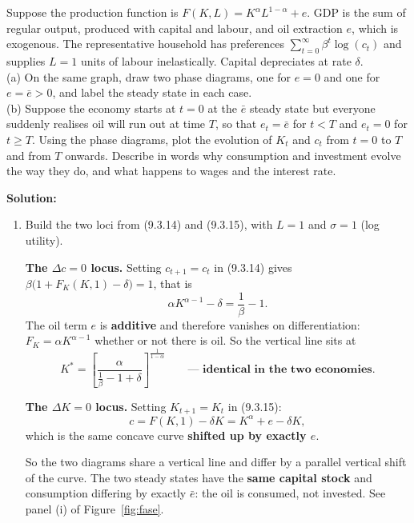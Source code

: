 \documentclass[12pt, letterpaper]{article}
\newcommand{\stst}{^{\ast}}
\begin{document}
\begin{tcolorbox}[oddbox,title={Problem 9.9 \quad An Oil-Producing Economy}]
\begin{tcolorbox}[questionbox]
Suppose the production function is $F(K,L)=K^\alpha L^{1-\alpha}+e$. GDP is the sum of regular
output, produced with capital and labour, and oil extraction $e$, which is exogenous. The
representative household has preferences $\sum_{t=0}^{\infty}\beta^t\log(c_t)$ and supplies
$L=1$ units of labour inelastically. Capital depreciates at rate $\delta$.\\[3pt]
(a) On the same graph, draw two phase diagrams, one for $e=0$ and one for $e=\bar e>0$, and
label the steady state in each case.\\
(b) Suppose the economy starts at $t=0$ at the $\bar e$ steady state but everyone suddenly
realises oil will run out at time $T$, so that $e_t=\bar e$ for $t<T$ and $e_t=0$ for
$t\ge T$. Using the phase diagrams, plot the evolution of $K_t$ and $c_t$ from $t=0$ to $T$
and from $T$ onwards. Describe in words why consumption and investment evolve the way they do,
and what happens to wages and the interest rate.
\end{tcolorbox}

\textbf{Solution:}

\begin{enumerate}
\item Build the two loci from (9.3.14) and (9.3.15), with $L=1$ and $\sigma=1$ (log utility).

\textbf{The $\Delta c=0$ locus.} Setting $c_{t+1}=c_t$ in (9.3.14) gives
$\beta\big(1+F_K(K,1)-\delta\big)=1$, that is
\[
\alpha K^{\alpha-1}-\delta=\frac{1}{\beta}-1 .
\]
The oil term $e$ is \textbf{additive} and therefore vanishes on differentiation:
$F_K=\alpha K^{\alpha-1}$ whether or not there is oil. So the vertical line sits at
\[
K\stst=\left[\frac{\alpha}{\frac{1}{\beta}-1+\delta}\right]^{\frac{1}{1-\alpha}}
\qquad\textbf{--- identical in the two economies.}
\]

\textbf{The $\Delta K=0$ locus.} Setting $K_{t+1}=K_t$ in (9.3.15):
\[
c=F(K,1)-\delta K=K^{\alpha}+e-\delta K,
\]
which is the same concave curve \textbf{shifted up by exactly $e$}.

\smallskip
So the two diagrams share a vertical line and differ by a parallel vertical shift of the curve.
The two steady states have the \textbf{same capital stock} and consumption differing by exactly
$\bar e$: the oil is consumed, not invested. See panel (i) of Figure~\ref{fig:fase}.


\end{enumerate}
\end{tcolorbox}
\end{document}
